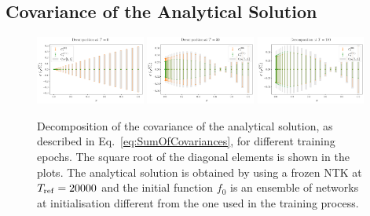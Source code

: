 \FloatBarrier

\subsection{Covariance of the Analytical Solution}
\label{sec:CovarianceAnlyticalSolution}


\begin{figure}[ht!]
  \centering
  \includegraphics[width=0.32\textwidth]{plots/analytical_solution/xT3/covariance/diagonal/decomposition/L0/linear/diag_error_decomposition_epoch_0_L0_linear.pdf}
  \includegraphics[width=0.32\textwidth]{plots/analytical_solution/xT3/covariance/diagonal/decomposition/L0/linear/diag_error_decomposition_epoch_50_L0_linear.pdf}
  \includegraphics[width=0.32\textwidth]{plots/analytical_solution/xT3/covariance/diagonal/decomposition/L0/linear/diag_error_decomposition_epoch_100_L0_linear.pdf}
  \caption{Decomposition of the covariance of the analytical solution, as
  described in Eq.~\eqref{eq:SumOfCovariances}, for different training epochs.
  The square root of the diagonal elements is shown in the plots. The analytical
  solution is obtained by using a frozen NTK at $T_{\rm{ref}}=20000$ and the
  initial function $f_0$ is an ensemble of networks at initialisation different
  from the one used in the training process.}
  \label{fig:analytical_covariance_L0}
\end{figure}
